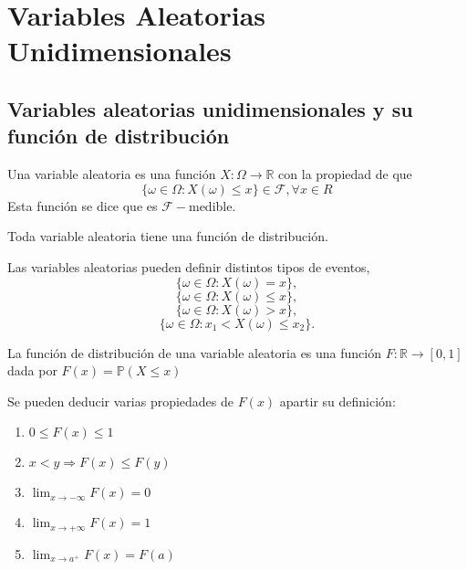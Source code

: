 \chapter{Variables Aleatorias Unidimensionales}
\section{Variables aleatorias unidimensionales y su función de distribución}

\begin{defn}
Una variable aleatoria es una función $X:\Omega\rightarrow\mathbb{R}$ con la propiedad de que \[ \{ \omega\in\Omega: X(\omega)\leq x \}\in\mathcal{F}, \forall x\in R\] Esta función se dice que es $\mathcal{F}-$medible.
\end{defn}

\begin{obs}
Toda variable aleatoria tiene una función de distribución.
\end{obs}

\begin{obs}
Las variables aleatorias pueden definir distintos tipos de eventos, \[ \{ \omega\in\Omega: X(\omega) = x \} ,\] \[ \{ \omega\in\Omega: X(\omega) \leq x \} ,\] \[ \{ \omega\in\Omega: X(\omega) > x \} ,\] \[ \{ \omega\in\Omega: x_1 < X(\omega) \leq x_2 \} .\]
\end{obs}

\begin{defn}
La función de distribución de una variable aleatoria es una función $F:\mathbb{R}\rightarrow[0,1]$ dada por $F(x) = \mathbb{P}(X \leq x)$
\end{defn}

\begin{prop}
Se pueden deducir varias propiedades de $F(x)$ apartir su definición:

\begin{enumerate}[label=(\roman*)]
    \item $0\leq F(x)\leq 1$
    \item $x<y \Rightarrow F(x)\leq F(y)$
    \item $\lim_{x\rightarrow -\infty} F(x) = 0$
    \item $\lim_{x\rightarrow +\infty} F(x) = 1$
    \item $\lim_{x\rightarrow a^+} F(x) = F(a)$
\end{enumerate}
\end{prop}

